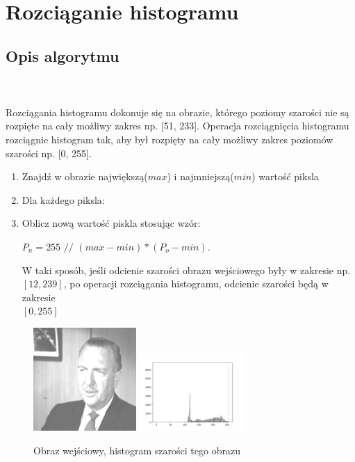 \documentclass[final,a4paper,openany,12pt]{mwbk}
\begin{document}
\section{Rozciąganie histogramu}
\subsection*{Opis algorytmu}
\hfill
\\\\
\indent Rozciągania histogramu dokonuje się na obrazie, którego poziomy szarości nie są rozpięte na cały możliwy zakres np.
[51, 233]. Operacja rozciągnięcia histogramu rozciągnie histogram tak, aby był rozpięty na cały możliwy zakres poziomów szarości np. [0, 255].
\begin{enumerate}
	\item Znajdź w obrazie największą($max$) i najmniejszą($min$) wartość piksla
	\item Dla każdego piksla:
	\item Oblicz nową wartość piskla stosując wzór:\\
	\centerline{$P_n = 255$ $//$ $(max - min) * (P_o - min)$.}
	W taki sposób, jeśli odcienie szarości obrazu wejściowego były w zakresie
	np. $[12, 239]$, po operacji rozciągania histogramu, odcienie szarości będą w zakresie\\
	$[0, 255]$
\end{enumerate}

\begin{figure}[H]
	\begin{center}
		\includegraphics[width=0.35\textwidth]{gentelman_gray_moveHist_result}
		\includegraphics[width=0.35\textwidth]{gentelman_gray_moveHist_histogram}
	\end{center}
	\caption{Obraz wejściowy, histogram szarości tego obrazu}
\end{figure}
\end{document}
